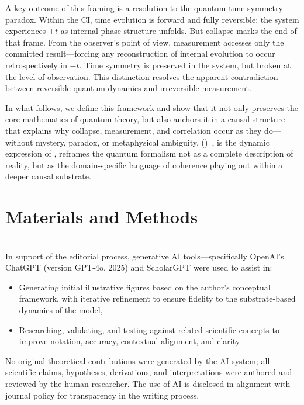 \documentclass[preprints,article,submit,pdftex,moreauthors]{Definitions/mdpi}
\begin{document}
A key outcome of this framing is a resolution to the quantum time symmetry paradox. Within the CI, time evolution is forward and fully reversible: the system experiences \( +t \) as internal phase structure unfolds. But collapse marks the end of that frame. From the observer’s point of view, measurement accesses only the committed result—forcing any reconstruction of internal evolution to occur retrospectively in \( -t \). Time symmetry is preserved in the system, but broken at the level of observation. This distinction resolves the apparent contradiction between reversible quantum dynamics and irreversible measurement.

In what follows, we define this framework and show that it not only preserves the core mathematics of quantum theory, but also anchors it in a causal structure that explains why collapse, measurement, and correlation occur as they do—without mystery, paradox, or metaphysical ambiguity. \qsd (\qsda)~\cite{bush2025}, is the dynamic expression of \qsdgsta, reframes the quantum formalism not as a complete description of reality, but as the domain-specific language of coherence playing out within a deeper causal substrate.

\section{Materials and Methods}
\qsdmethodstatement
\\
In support of the editorial process, generative AI tools—specifically OpenAI’s ChatGPT (version GPT-4o, 2025) and ScholarGPT were used to assist in:
\begin{itemize}
    \item Generating initial illustrative figures based on the author’s conceptual framework, with iterative refinement to ensure fidelity to the substrate-based dynamics of the model,
    \item Researching, validating, and testing against related scientific concepts to improve notation, accuracy, contextual alignment, and clarity
\end{itemize}

No original theoretical contributions were generated by the AI system; all scientific claims, hypotheses, derivations, and interpretations were authored and reviewed by the human researcher. The use of AI is disclosed in alignment with journal policy for transparency in the writing process.
\end{document}
